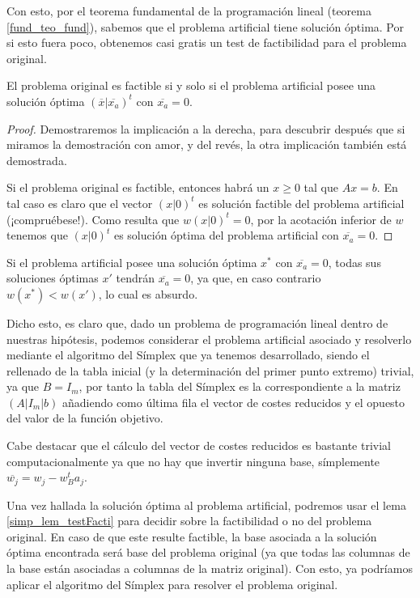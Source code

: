 Con esto, por el teorema fundamental de la programación lineal (teorema \ref{fund_teo_fund}), sabemos que el problema artificial tiene solución óptima. Por si esto fuera poco, obtenemos casi gratis un test de factibilidad para el problema original.
\begin{lem}
	\label{simp_lem_testFacti}
	El problema original es factible si y solo si el problema artificial posee una solución óptima $(\overline{x}|\overline{x_a})^t$ con $\overline{x_a}=0$.
\end{lem}
\begin{proof}
	Demostraremos la implicación a la derecha, para descubrir después que si miramos la demostración con amor, y del revés, la otra implicación también está demostrada.
	
	Si el problema original es factible, entonces habrá un $x\geq 0$ tal que $Ax=b$. En tal caso es claro que el vector $(x|0)^t$ es solución factible del problema artificial (¡compruébese!). Como resulta que $w(x|0)^t=0$, por la acotación inferior de $w$ tenemos que $(x|0)^t$ es solución óptima del problema artificial con $\overline{x_a}=0$.
\end{proof}
\begin{obs}[Sutileza]
	Si el problema artificial posee una solución óptima $x^*$ con $\overline{x_a}=0$, todas sus soluciones óptimas $x'$ tendrán $\overline{x_a}=0$, ya que, en caso contrario $w(x^*)<w(x')$, lo cual es absurdo. 
\end{obs}
Dicho esto, es claro que, dado un problema de programación lineal dentro de nuestras hipótesis, podemos considerar el problema artificial asociado y resolverlo mediante el algoritmo del Símplex que ya tenemos desarrollado, siendo el rellenado de la tabla inicial (y la determinación del primer punto extremo) trivial, ya que $B=I_m$, por tanto la tabla del Símplex es la correspondiente a la matriz $(A|I_m|b)$ añadiendo como última fila el vector de costes reducidos y el opuesto del valor de la función objetivo.

Cabe destacar que el cálculo del vector de costes reducidos es bastante trivial computacionalmente ya que no hay que invertir ninguna base, símplemente $\overline{w_j}=w_j-w_B^ta_j$.

Una vez hallada la solución óptima al problema artificial, podremos usar el lema \ref{simp_lem_testFacti} para decidir sobre la factibilidad o no del problema original. En caso de que este resulte factible, la base asociada a la solución óptima encontrada será base del problema original (ya que todas las columnas de la base están asociadas a columnas de la matriz original). Con esto, ya podríamos aplicar el algoritmo del Símplex para resolver el problema original.

